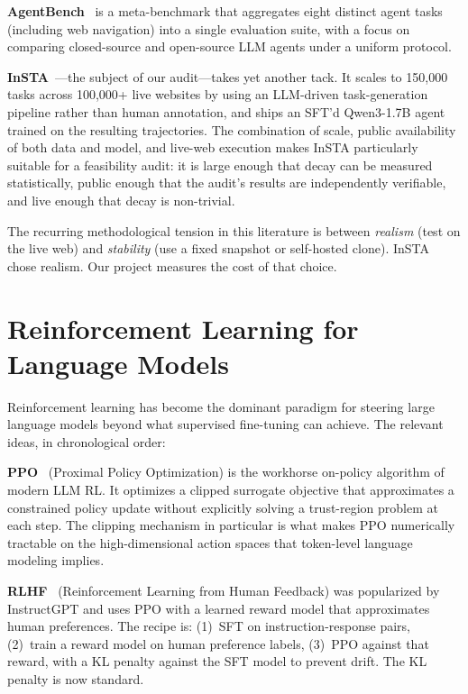 \documentclass[12pt,a4paper]{report}
\begin{document}
\textbf{AgentBench}~\cite{liu2023agentbench} is a meta-benchmark that aggregates eight distinct agent tasks (including web navigation) into a single evaluation suite, with a focus on comparing closed-source and open-source LLM agents under a uniform protocol.

\textbf{InSTA}~\cite{trabucco2025insta}---the subject of our audit---takes yet another tack. It scales to 150{,}000 tasks across 100{,}000+ live websites by using an LLM-driven task-generation pipeline rather than human annotation, and ships an SFT'd Qwen3-1.7B agent trained on the resulting trajectories. The combination of scale, public availability of both data and model, and live-web execution makes InSTA particularly suitable for a feasibility audit: it is large enough that decay can be measured statistically, public enough that the audit's results are independently verifiable, and live enough that decay is non-trivial.

The recurring methodological tension in this literature is between \emph{realism} (test on the live web) and \emph{stability} (use a fixed snapshot or self-hosted clone). InSTA chose realism. Our project measures the cost of that choice.

\section{Reinforcement Learning for Language Models}\label{sec:lit-rl}

Reinforcement learning has become the dominant paradigm for steering large language models beyond what supervised fine-tuning can achieve. The relevant ideas, in chronological order:

\textbf{PPO}~\cite{schulman2017ppo} (Proximal Policy Optimization) is the workhorse on-policy algorithm of modern LLM RL. It optimizes a clipped surrogate objective that approximates a constrained policy update without explicitly solving a trust-region problem at each step. The clipping mechanism in particular is what makes PPO numerically tractable on the high-dimensional action spaces that token-level language modeling implies.

\textbf{RLHF}~\cite{ouyang2022instructgpt} (Reinforcement Learning from Human Feedback) was popularized by InstructGPT and uses PPO with a learned reward model that approximates human preferences. The recipe is: (1)~SFT on instruction-response pairs, (2)~train a reward model on human preference labels, (3)~PPO against that reward, with a KL penalty against the SFT model to prevent drift. The KL penalty is now standard.
\end{document}
